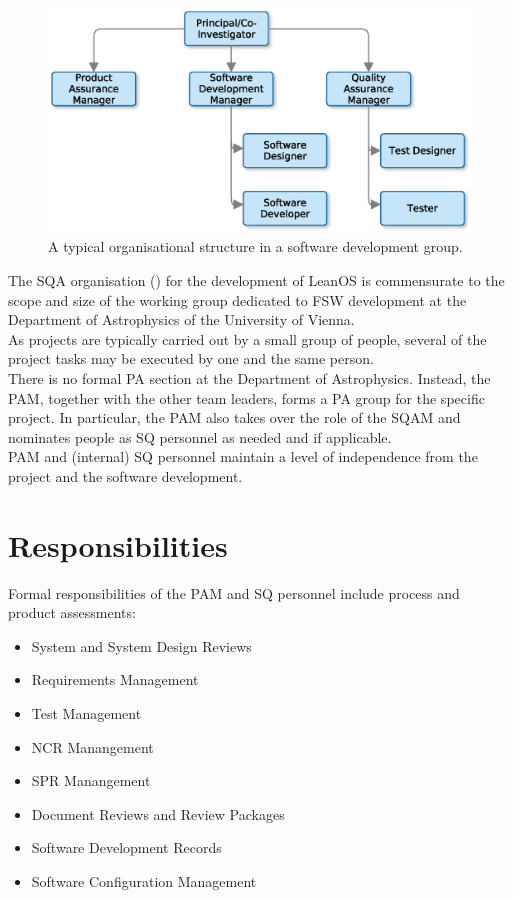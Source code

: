 \begin{figure}[htb]
\begin{center}
	\includegraphics[width=0.7\columnwidth]{images/software_dev_structure}
	\caption{A typical organisational structure in a software development
		 group.}
	\label{fig:sw_dev_org}
\end{center}
\end{figure}

\noindent
The \gls{SQA} organisation () for the development of LeanOS
is commensurate to the scope and size of the working group dedicated to
\gls{FSW} development at the Department of Astrophysics of the University of
Vienna.\\

\noindent
As projects are typically carried out by a small group of people, several of
the project tasks may be executed by one and the same person.\\

\noindent
There is no formal \gls{PA} section at the Department of Astrophysics.
Instead, the \gls{PAM}, together with the other team leaders, forms a \gls{PA}
group for the specific project. In particular, the \gls{PAM} also takes over the
role of the \gls{SQAM} and nominates people as \gls{SQ} personnel as needed
and if applicable.\\

\noindent
\gls{PAM} and (internal) \gls{SQ} personnel maintain a level of independence
from the project and the software development.



\section{Responsibilities}

Formal responsibilities of the \gls{PAM} and \gls{SQ} personnel include process
and product assessments:

\begin{itemize}
	\item System and System Design Reviews
	\item Requirements Management
	\item Test Management
	\item \gls{NCR} Manangement
	\item \gls{SPR} Manangement
	\item Document Reviews and Review Packages
	\item Software Development Records
	\item Software Configuration Management
\end{itemize}

